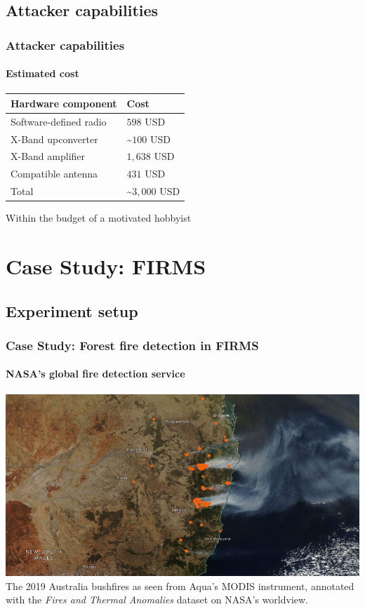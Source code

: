 \documentclass[aspectratio=169]{beamer}
\begin{document}
\subsection{Attacker capabilities}

\def\footnoterule{\oldfootnoterule}
\begin{frame}
  \frametitle{Attacker capabilities}
  \framesubtitle{Estimated cost}

  \begin{center}
  \begin{tabular}{ l | l }
    \textbf{Hardware component} & \textbf{Cost} \\
    \hline
    Software-defined radio & $598$ USD\footnotemark[1] \\
    X-Band upconverter & \textasciitilde$100$ USD\footnotemark[2] \\
    X-Band amplifier & $1,638$ USD \\
    Compatible antenna & $431$ USD \\
    \hline
    Total & \textasciitilde$3,000$ USD
  \end{tabular}
  \end{center}


  \pause
  \begin{center}
    Within the budget of a motivated hobbyist
  \end{center}
\end{frame}

\section{Case Study: FIRMS}
\subsection{Experiment setup}

\begin{frame}
  \frametitle{Case Study: Forest fire detection in FIRMS}
  \framesubtitle{NASA's global fire detection service}
  \centering
  \includegraphics[width=0.9\columnwidth]{images/bushfire.png}
  \newline
  The 2019 Australia bushfires as seen from Aqua's MODIS instrument, annotated with the \textit{Fires and Thermal Anomalies} dataset on NASA's worldview.
\end{frame}
\end{document}
